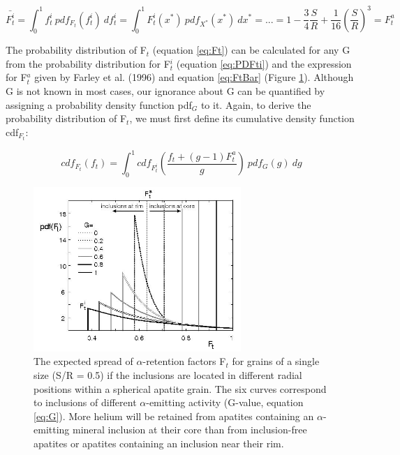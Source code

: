 \documentclass{article}
\begin{document}
\begin{equation}
  \label{eq:FtBar}
  \bar{F_t^i} = \int_{0}^{1} f_t^i ~ pdf_{F_t}(f_t^i) ~ df_t^i 
            = \int_0^1 F_t^i(x^*) ~ pdf_{X^*}(x^*) ~ dx^*
            = ... 
            = 1 - \frac{3}{4}\frac{S}{R} + \frac{1}{16}\left(\frac{S}{R}\right)^3
            = F_t^a
\end{equation}

The probability  distribution of  F$_t$ (equation \ref{eq:Ft})  can be
calculated  for any G  from the  probability distribution  for F$_t^i$
(equation  \ref{eq:PDFti}) and  the  expression for  F$_t^a$ given  by
Farley   et   al.    (1996)   and  equation   \ref{eq:FtBar}   (Figure
\ref{fig:CDFt}).  Although G is not known in most cases, our ignorance
about G can be quantified  by assigning a probability density function
pdf$_G$  to it.   Again,  to derive  the  probability distribution  of
F$_t$,  we   must  first   define  its  cumulative   density  function
cdf$_{F_t}$:

\begin{equation}
  \label{eq:CDFt}
  cdf_{F_t}(f_t) = \int_{0}^{1} cdf_{F_t^i}\left(\frac{f_t+(g-1)F_t^a}{g}\right) ~
                 pdf_G(g) ~ dg
\end{equation}

\begin{figure}[htbp]
  \centering
  \includegraphics[width=0.7\textwidth]{pdFtG1.jpg}
  \caption{
    The expected spread of $\alpha$-retention factors F$_t$ for grains
    of a  single size  (S/R =  0.5) if the  inclusions are  located in
    different radial  positions within a spherical  apatite grain. The
    six curves correspond to inclusions of different $\alpha$-emitting
    activity  (G-value,  equation \ref{eq:G}).   More  helium will  be
    retained  from apatites  containing  an $\alpha$-emitting  mineral
    inclusion  at  their core  than  from  inclusion-free apatites  or
    apatites containing an inclusion near their rim.}
  \label{fig:CDFt}
\end{figure}
\end{document}
